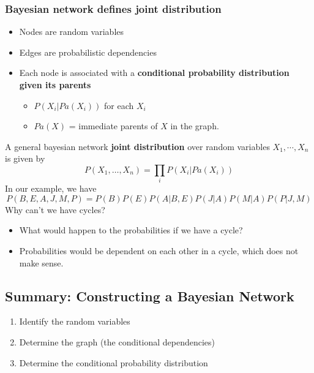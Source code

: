 \documentclass[10pt]{article}
\begin{document}
\subsubsection*{Bayesian network defines joint distribution}
\begin{itemize}
	\item Nodes are random variables
	\item Edges are probabilistic dependencies
	\item Each node is associated with a \textbf{conditional probability distribution given its parents}
	\begin{itemize}
	    \item $P(X_i | Pa(X_i))$ for each $X_i$
	    \item $Pa(X)$ = immediate parents of $X$ in the graph.
    \end{itemize}
\end{itemize}
\begin{center}
\end{center}
A general bayesian network \textbf{joint distribution} over random variables $X_1, \cdots, X_n$ is given by
\[P(X_1, \dots, X_n) = \prod_i P(X_i | Pa(X_i))\]
In our example, we have
\[P(B, E, A, J, M, P) = P(B) P(E) P(A | B, E) P(J | A) P(M | A) P(P | J, M)\]
Why can't we have cycles?
\begin{itemize}
	\item What would happen to the probabilities if we have a cycle?
	\item Probabilities would be dependent on each other in a cycle, which does not make sense.
\end{itemize}

\subsection*{Summary: Constructing a Bayesian Network}
\begin{enumerate}
	\item Identify the random variables
	\item Determine the graph (the conditional dependencies)
	\item Determine the conditional probability distribution
\end{enumerate}
\end{document}
